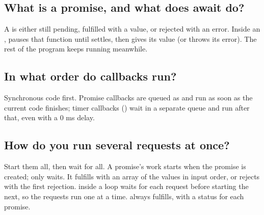 \label{ch:c13}

\subsection{What is a promise, and what does await do?}%
A  is either still pending, fulfilled with a value, or rejected with an error. Inside an ,  pauses that function until  settles, then gives its value (or throws its error). The rest of the program keeps running meanwhile.

\subsection{In what order do callbacks run?}%
Synchronous code first. Promise callbacks are queued as  and run as soon as the current code finishes; timer callbacks () wait in a separate queue and run after that, even with a 0 ms delay.

\subsection{How do you run several requests at once?}%
Start them all, then wait for all. A promise's work starts when the promise is created;  only waits. It fulfills with an array of the values in input order, or rejects with the first rejection.  inside a loop waits for each request before starting the next, so the requests run one at a time.  always fulfills, with a status for each promise.

